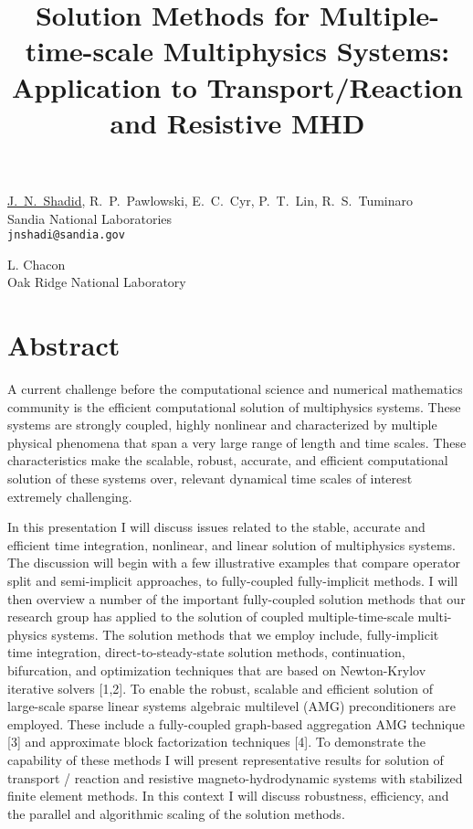 \title{Solution Methods for Multiple-time-scale Multiphysics Systems: Application to Transport/Reaction and Resistive MHD}
\author{} \institute{}
\maketitle

\begin{center}
{\large \underline{J.~N.~Shadid}, R.~P.~Pawlowski, E.~C.~Cyr, P.~T.~Lin, R.~S.~Tuminaro}\\
Sandia National Laboratories\\
{\tt jnshadi@sandia.gov}\\
\vspace{4mm}

{\large L. Chacon}\\
Oak Ridge National Laboratory
\end{center}

\section*{Abstract}
A current challenge before the computational science and numerical mathematics community is the efficient computational solution of multiphysics systems.  These systems are strongly coupled, highly nonlinear and characterized by multiple physical phenomena that span a very large range of length and time scales.   These characteristics make the scalable, robust, accurate, and efficient computational solution of these systems over, relevant dynamical time scales of interest extremely challenging.

In this presentation I will discuss issues related to the stable, accurate and efficient time integration, nonlinear, and linear solution of multiphysics systems. The discussion will begin with a few illustrative examples that compare operator split and semi-implicit approaches, to fully-coupled fully-implicit methods. I will then overview a number of the important fully-coupled solution methods that our research group has applied to the solution of coupled multiple-time-scale multi-physics systems. The solution methods that we employ include, fully-implicit time integration, direct-to-steady-state solution methods, continuation, bifurcation, and optimization techniques that are based on Newton-Krylov iterative solvers [1,2]. To enable the robust, scalable and efficient solution of large-scale sparse  linear systems algebraic multilevel (AMG) preconditioners are employed. These include a fully-coupled graph-based aggregation AMG technique [3] and approximate block factorization techniques [4]. To demonstrate the capability of these methods I will present representative results for solution of transport / reaction and resistive 
magneto-hydrodynamic systems with stabilized finite element methods. In this context I will discuss robustness, efficiency, and the parallel and algorithmic scaling of the solution methods.

